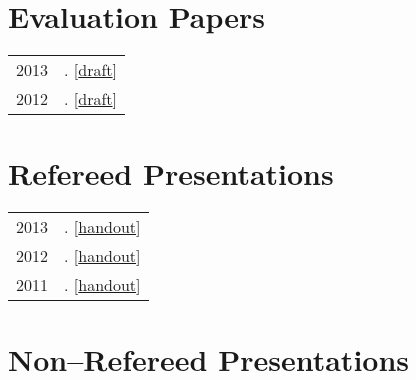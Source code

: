 \documentclass[letterpaper]{article}
\makeatletter
\newcommand{\myvrule}{\color{lightgray}\vrule width 1.0pt}
\newenvironment{cvsection}{%
  \vspace{-3ex}
  \renewcommand{\arraystretch}{1.5}
  \begin{longtable}{@{} L R @{}}
}{%
  \end{longtable}
  \vspace{1ex}
  \renewcommand{\arraystretch}{1.0}
}
\makeatother
\begin{document}
\section*{Evaluation Papers}

\begin{cvsection}
  2013 & \hspace{0pt}.
  [\href{http://people.linguistics.mcgill.ca/~brian.buccola/files/buccola-eval2.pdf}{draft}] \\

  2012 & \hspace{0pt}.
  [\href{http://people.linguistics.mcgill.ca/~brian.buccola/files/buccola-eval1.pdf}{draft}]
\end{cvsection}



\section*{Refereed Presentations}

\begin{cvsection}
  2013 & \hspace{0pt}.
  [\href{http://people.linguistics.mcgill.ca/~brian.buccola/files/buccola-mot.pdf}{handout}] \\

  2012 & \hspace{0pt}.
  [\href{http://people.linguistics.mcgill.ca/~brian.buccola/files/buccola-tom5-handout.pdf}{handout}] \\

  2011 & \hspace{0pt}.
  [\href{http://people.linguistics.mcgill.ca/~brian.buccola/files/buccola-tom4-handout.pdf}{handout}]
\end{cvsection}



\section*{Non--Refereed Presentations}
\end{document}
